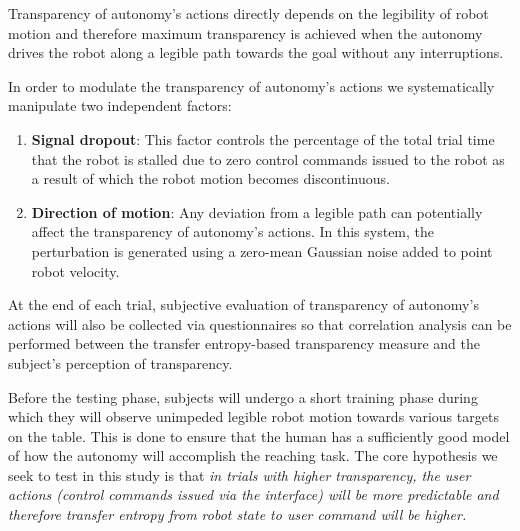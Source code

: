 \documentclass[12pt]{article}
\begin{document}
Transparency of autonomy's actions directly depends on the legibility of robot motion and therefore maximum transparency is achieved when the autonomy drives the robot along a legible path towards the goal without any interruptions. 

In order to modulate the transparency of autonomy's actions we systematically manipulate two independent factors:
\begin{enumerate}
	\item \textbf{Signal dropout}: This factor controls the percentage of the total trial time that the robot is stalled due to zero control commands issued to the robot as a result of which the robot motion becomes discontinuous. 
	\item \textbf{Direction of motion}: Any deviation from a legible path can potentially affect the transparency of autonomy's actions. In this system, the perturbation is generated using a zero-mean Gaussian noise added to point robot velocity. 
\end{enumerate}


At the end of each trial, subjective evaluation of transparency of autonomy's actions will also be collected via questionnaires so that correlation analysis can be performed between the transfer entropy-based transparency measure and the subject's perception of transparency. 

Before the testing phase, subjects will undergo a short training phase during which they will observe unimpeded legible robot motion towards various targets on the table. This is done to ensure that the human has a sufficiently good model of how the autonomy will accomplish the reaching task.  
The core hypothesis we seek to test in this study is that \textit{in trials with higher transparency, the user actions (control commands issued via the interface) will be more predictable and therefore transfer entropy from robot state to user command will be higher. }
\end{document}
